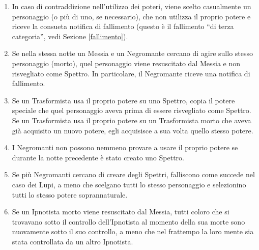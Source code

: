 \documentclass[a4paper,10pt]{article}
\begin{document}
\begin{enumerate}
 
 \item In caso di contraddizione nell'utilizzo dei poteri, viene scelto casualmente un personaggio (o più di uno, se necessario), che non utilizza il proprio potere e riceve la consueta notifica di fallimento (questo è il fallimento ``di terza categoria'', vedi Sezione \ref{fallimento}).
 
  
 \vspace{-4mm}
 \item Se nella stessa notte un Messia e un Negromante cercano di agire sullo stesso personaggio (morto), quel personaggio viene resuscitato dal Messia e non risvegliato come Spettro. In particolare, il Negromante riceve una notifica di fallimento.

 \item Se un Trasformista usa il proprio potere su uno Spettro, copia il potere speciale che quel personaggio aveva prima di essere risvegliato come Spettro.
 Se un Trasformista usa il proprio potere su un Trasformista morto che aveva già acquisito un nuovo potere, egli acquisisce a sua volta quello stesso potere.
 
 \item I Negromanti non possono nemmeno provare a usare il proprio potere se durante la notte precedente è stato creato uno Spettro.
 
 \item Se più Negromanti cercano di creare degli Spettri, falliscono come succede nel caso dei Lupi, a meno che scelgano tutti lo stesso personaggio e selezionino tutti lo stesso potere soprannaturale.

 \item Se un Ipnotista morto viene resuscitato dal Messia, tutti coloro che si trovavano sotto il controllo dell'Ipnotista al momento della sua morte sono nuovamente sotto il suo controllo, a meno che nel frattempo la loro mente sia stata controllata da un altro Ipnotista.


\end{enumerate}
\end{document}
